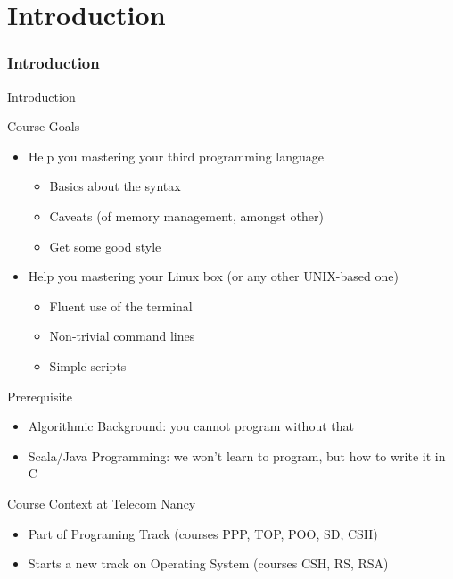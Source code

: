 \setcounter{part}{-1}
\part{Introduction}
\makeatletter{}\makeatother
\section{Introduction}
\begin{frame}{Introduction}
  \begin{block}{Course Goals}
    \begin{itemize}
    \item Help you mastering your third programming language
      \begin{itemize}
      \item Basics about the syntax
      \item Caveats (of memory management, amongst other)
      \item Get some good style
      \end{itemize}
    \item Help you mastering your Linux box (or any other UNIX-based one)
      \begin{itemize}
      \item Fluent use of the terminal
      \item Non-trivial command lines
      \item Simple scripts
      \end{itemize}

    \end{itemize}
  \end{block}

  \begin{block}{Prerequisite}
    \begin{itemize}
    \item Algorithmic Background: you cannot program without that
    \item Scala/Java Programming: we won't learn to program, but how to write it in C
    \end{itemize}
  \end{block}

  \begin{block}{Course Context at Telecom Nancy}
    \begin{itemize}
    \item Part of Programing Track (courses PPP, TOP, POO, SD, CSH)
    \item Starts a new track on Operating System (courses CSH, RS, RSA)
    \end{itemize}
  \end{block}
\end{frame}

